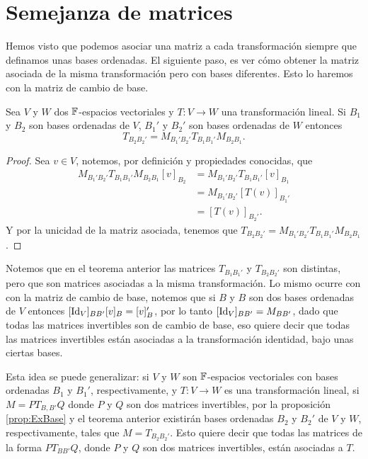 \section{Semejanza de matrices}

Hemos visto que podemos asociar una matriz a cada transformación siempre que definamos unas bases ordenadas. El siguiente paso, es ver cómo obtener la matriz asociada de la misma transformación pero con bases diferentes. Esto lo haremos con la matriz de cambio de base.

\begin{teor}
  Sea $V$ y $W$ dos $\mathbb{F}$-espacios vectoriales y $T \colon V \to W$ una transformación lineal. Si $B_1$ y $B_2$ son bases ordenadas de $V$, $B_1'$ y $B_2'$ son bases ordenadas de $W$ entonces
  \[T_{B_2 B_2'} = M_{B_1' B_2'} T_{B_1 B_1'}M_{B_2 B_1}. \]
\end{teor}
\begin{proof}
  Sea $v \in V$, notemos, por definición y propiedades conocidas, que
  \begin{align*}
    M_{B_1' B_2'} T_{B_1 B_1'}M_{B_2 B_1} [v]_{B_2} &= M_{B_1' B_2'} T_{B_1 B_1'} [v]_{B_1} \\
      &= M_{B_1' B_2'} [T(v)]_{B_1'} \\
      &= [T(v)]_{B_2'}.
  \end{align*}
  Y por la unicidad de la matriz asociada, tenemos que $T_{B_2 B_2'} = M_{B_1' B_2'} T_{B_1 B_1'}M_{B_2 B_1}$.
\end{proof}

Notemos que en el teorema anterior las matrices $T_{B_1B_1'}$ y $T_{B_2B_2'}$ son distintas, pero que son matrices asociadas a la misma transformación. Lo mismo ocurre con con la matriz de cambio de base, notemos que si $B$ y $B$ son dos bases ordenadas de $V$ entonces $[\mathrm{Id}_V]_{BB'}[v]_B = [v]_B'$, por lo tanto $[\mathrm{Id}_V]_{BB'} = M_{BB'}$, dado que todas las matrices invertibles son de cambio de base, eso quiere decir que todas las matrices invertibles están asociadas a la transformación identidad, bajo unas ciertas bases.

Esta idea se puede generalizar: si $V$ y $W$ son $\mathbb{F}$-espacios vectoriales con bases ordenadas $B_1$ y $B_1'$, respectivamente, y $T\colon V \to W$ es una transformación lineal, si $M = PT_{B,B'}Q$ donde $P$ y $Q$ son dos matrices invertibles, por la proposición \ref{prop:ExBase} y el teorema anterior existirán bases ordenadas $B_2$ y $B_2'$ de $V$ y $W$, respectivamente, tales que $M = T_{B_2 B_2'}$. Esto quiere decir que todas las matrices de la forma $PT_{BB'}Q$, donde $P$ y $Q$ son dos matrices invertibles, están asociadas a $T$.

